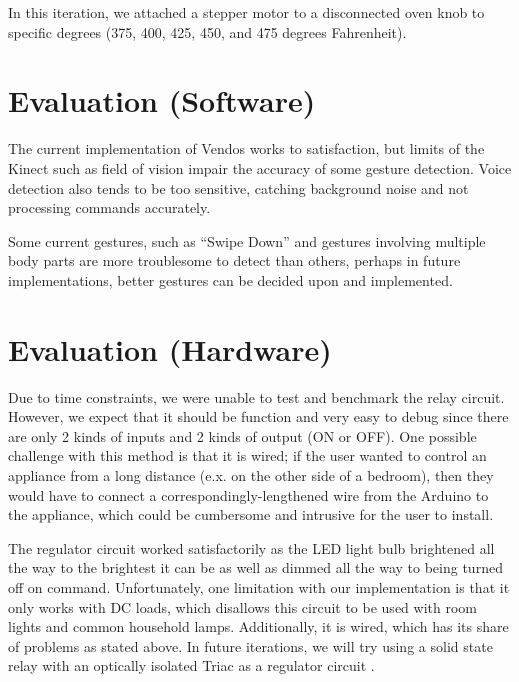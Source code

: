 \documentclass{chi-ext}
\begin{document}
In this iteration, we attached a stepper motor to a disconnected oven knob to specific degrees (375, 400, 425, 450, and 475 degrees Fahrenheit). 


\section{Evaluation (Software)}

The current implementation of Vendos works to satisfaction, but limits of the Kinect such as field of vision impair the accuracy of some gesture detection.
Voice detection also tends to be too sensitive, catching background noise and not processing commands accurately.
 
Some current gestures, such as “Swipe Down” and gestures involving multiple body parts are more troublesome to detect than others, perhaps in future implementations, better gestures can be decided upon and implemented.

\section{Evaluation (Hardware)}


Due to time constraints, we were unable to test and benchmark the relay circuit.
However, we expect that it should be function and very easy to debug since there are only 2 kinds of inputs and 2 kinds of output (ON or OFF).
One possible challenge with this method is that it is wired; if the user wanted to control an appliance from a long distance (e.x. on the other side of a bedroom), then they would have to connect a correspondingly-lengthened wire from the Arduino to the appliance, which could be cumbersome and intrusive for the user to install.

The regulator circuit worked satisfactorily as the LED light bulb brightened all the way to the brightest it can be as well as dimmed all the way to being turned off on command.
Unfortunately, one limitation with our implementation is that it only works with DC loads, which disallows this circuit to be used with room lights and common household lamps.
Additionally, it is wired, which has its share of problems as stated above.
In future iterations, we will try using a solid state relay with an optically isolated Triac as a regulator circuit \cite{_arduino_lights}.
\end{document}
